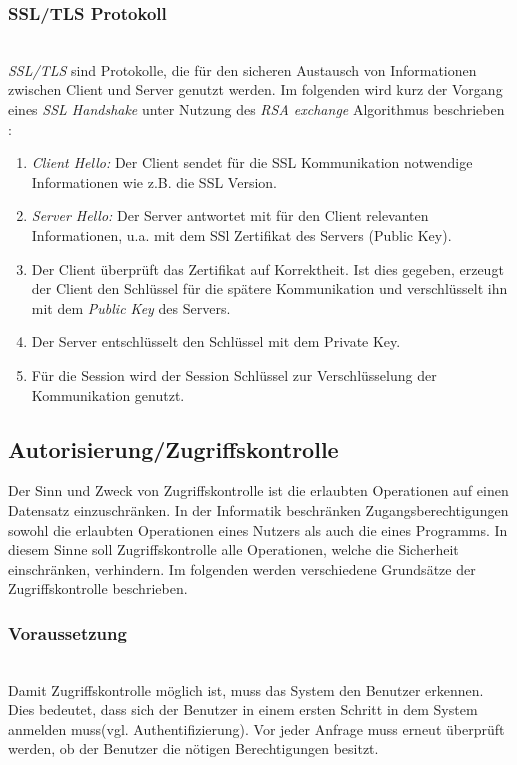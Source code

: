 \subsubsection{SSL/TLS Protokoll}\hspace*{\fill} \\
\textit{SSL/TLS} sind Protokolle, die für den sicheren Austausch von Informationen zwischen Client und Server genutzt werden. Im folgenden wird kurz der Vorgang eines \textit{SSL Handshake} unter Nutzung des \textit{RSA exchange} Algorithmus beschrieben \cite{eronen2005pre}:
\begin{enumerate}
\item \textit{Client Hello:} Der Client sendet für die SSL Kommunikation notwendige Informationen wie z.B. die SSL Version.
\item \textit{Server Hello:} Der Server antwortet mit für den Client relevanten Informationen, u.a. mit dem SSl Zertifikat des Servers (Public Key).
\item  Der Client überprüft das Zertifikat auf Korrektheit.  Ist dies gegeben, erzeugt der Client den Schlüssel für die spätere Kommunikation und verschlüsselt ihn mit dem \textit{Public Key} des Servers.
\item Der Server entschlüsselt den Schlüssel mit dem Private Key.
\item Für die Session wird der Session Schlüssel zur Verschlüsselung der Kommunikation genutzt.
\end{enumerate}	
\subsection{Autorisierung/Zugriffskontrolle}
Der Sinn und Zweck von Zugriffskontrolle ist die erlaubten Operationen auf einen Datensatz einzuschränken. In der Informatik beschränken Zugangsberechtigungen sowohl die erlaubten Operationen eines Nutzers als auch die eines Programms. In diesem Sinne soll Zugriffskontrolle alle Operationen, welche die Sicherheit einschränken, verhindern. Im folgenden werden verschiedene Grundsätze der Zugriffskontrolle beschrieben.

\subsubsection*{Voraussetzung}\hspace*{\fill} \\
Damit Zugriffskontrolle möglich ist, muss das System den Benutzer erkennen. Dies bedeutet, dass sich der Benutzer in einem ersten Schritt in dem System anmelden muss(vgl. Authentifizierung). Vor jeder Anfrage muss erneut überprüft werden, ob der Benutzer die nötigen Berechtigungen besitzt.
